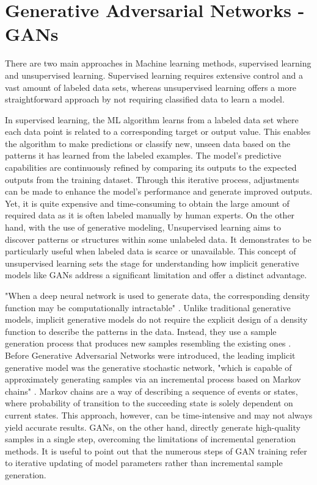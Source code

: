 \section{Generative Adversarial Networks - GANs}
\label{GAN}

There are two main approaches in Machine learning methods, 
supervised learning and unsupervised learning. Supervised learning requires extensive control and a vast amount of labeled data sets, whereas unsupervised learning offers a more straightforward approach by not requiring classified data to learn a model.

In supervised learning, the ML algorithm learns from a labeled data set where each data point is related to a corresponding target or output value. This enables the algorithm to make predictions or classify new, unseen data based on the patterns it has learned from the labeled examples. The model's predictive capabilities are continuously refined by comparing its outputs to the expected outputs from the training dataset. Through this iterative process, adjustments can be made to enhance the model's performance and generate improved outputs. Yet, it is quite expensive and time-consuming to obtain the large amount of required data as it is often labeled manually by human experts. On the other hand, with the use of generative modeling, Unsupervised learning aims to discover patterns or structures within some unlabeled data. It demonstrates to be particularly useful when labeled data is scarce or unavailable. This concept of unsupervised learning sets the stage for understanding how implicit generative models like GANs address a significant limitation and offer a distinct advantage.

"When a deep neural network is used to generate data, the corresponding density function may be computationally intractable" \citep{goodfellowGAN}. Unlike traditional generative models, implicit generative models do not require the explicit design of a density function to describe the patterns in the data. Instead, they use a sample generation process that produces new samples resembling the existing ones \citep{goodfellowGAN}. Before Generative Adversarial Networks were introduced, the leading implicit generative model was the generative stochastic network, "which is capable of approximately generating samples via an incremental process based on Markov chains" \citep{goodfellowGAN}. Markov chains are a way of describing a sequence of events or states, where probability of transition to the succeeding state is solely dependent on current states. This approach, however,  can be time-intensive and may not always yield accurate results. GANs, on the other hand, directly generate high-quality samples in a single step, overcoming the limitations of incremental generation methods. It is useful to point out that the numerous steps of GAN training refer to iterative updating of model parameters rather than incremental sample generation.

